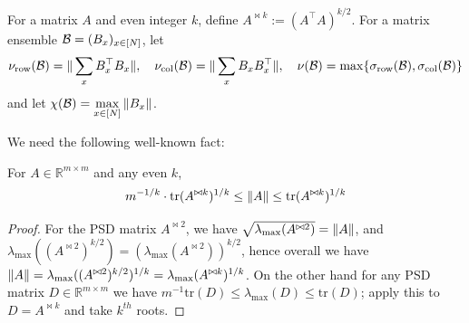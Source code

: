 \begin{definition}
For a matrix $A$ and even integer $k$, define $A^{\bowtie k}:= (A^\top A)^{k/2}$. For a matrix ensemble $\mathcal{B} = (B_x)_{x \in 
[N]}$, let
\[
\nu_{\mathrm{row}}(\mathcal{B}) = \Vert  \sum_x B_x^\top B_x \Vert, \quad \nu_{\mathrm{col}}(\mathcal{B}) = \Vert  \sum_x  B_x B_x^\top  \Vert, \quad 
\nu(\mathcal{B}) = \max\{\sigma_\mathrm{row}(\mathcal{B}), \sigma_\mathrm{col}(\mathcal{B})\}
\]
and let $\chi(\mathcal{B}) = \max\limits_{x \in [N]} \Vert B_x \Vert$.
\end{definition}
We need the following well-known fact:
\begin{lemma}\label{cellprobe:lem:trace-norm}
For $A \in \mathbb{R}^{m \times m}$ and any even $k$, 
\[
m^{-1/k}\cdot \mathrm{tr}(A^{\bowtie k})^{1/k} \leq \Vert A \Vert \leq \mathrm{tr}(A^{\bowtie k})^{1/k}\]
\end{lemma}
\begin{proof}
For the PSD matrix $A^{\bowtie 2}$, we have $\sqrt{\lambda_{\max}(A^{\bowtie 2})} = \Vert A \Vert$, and $\lambda_{\max}((A^{\bowtie 2})^{k/2}) = (\lambda_{\max}(A^{\bowtie 2}))^{k/2}$, hence overall we have $\Vert A \Vert = \lambda_{\max}((A^{\bowtie 2})^{k/2})^{1/k} = \lambda_{\max}(A^{\bowtie k})^{1/k}$. On the other hand for any PSD matrix $D \in \mathbb{R}^{m \times m}$ we have $m^{-1}\mathrm{tr}(D) \leq \lambda_{\max}(D) \leq  \mathrm{tr}(D)$; apply this to $D = A^{\bowtie k}$ and take $k^{th}$ roots.
\end{proof}


